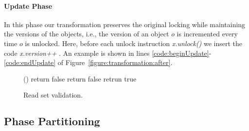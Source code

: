 \paragraph{Update Phase}
In this phase our transformation preserves the original locking while maintaining the versions of the objects, i.e., the version of an object $o$ is incremented every time $o$ is unlocked.
Here, before each unlock instruction \emph{\ttfamily x.unlock()} we insert the code \emph{\ttfamily x.version++} .
An example is shown in lines \ref{code:beginUpdate}-\ref{code:endUpdate} of Figure~\ref{figure:transformation:after}.






\begin{figure}
\scriptsize
\begin{algorithmic}[1]{}
		{\ttfamily
		()
			\State return false 
			\EndIf
				\State return false 
			\EndIf
		\EndFor
		\State retrun true 
		\EndFunction
		}
\end{algorithmic}
\caption{Read set validation.\label{figure::validate}}
\end{figure}

\subsection{Phase Partitioning}\label{ssec:extendedTran}



